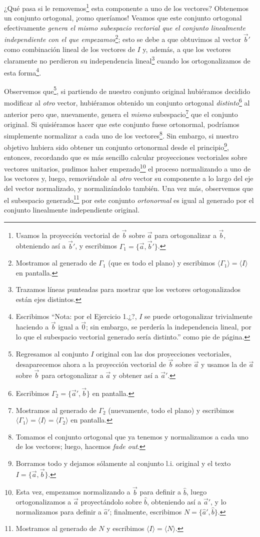\documentclass[12pt,dvipsnames]{article}
\numberwithin{equation}{section}
\begin{document}
¿Qué pasa si le removemos\footnote{Usamos la proyección vectorial de $\vec{b}$ sobre $\vec{a}$ para ortogonalizar a $\vec{b}$, obteniendo así a $\vec{b}'$, y escribimos $\Gamma_1=\{\vec{a},\vec{b}'\}$.} esta componente a uno de los vectores? Obtenemos un conjunto ortogonal, ¡como queríamos! Veamos que este conjunto ortogonal efectivamente \emph{genera el mismo subespacio vectorial que el conjunto linealmente independiente con el que empezamos}\footnote{Mostramos al generado de $\Gamma_1$ (que es todo el plano) y escribimos $\langle \Gamma_1 \rangle = \langle I \rangle$ en pantalla.}; esto se debe a que obtuvimos al vector $\vec{b}'$ como combinación lineal de los vectores de $I$ y, además, a que los vectores claramente no perdieron su independencia lineal\footnote{Trazamos líneas punteadas para mostrar que los vectores ortogonalizados están ejes distintos.} cuando los ortogonalizamos de esta forma\footnote{Escribimos ``Nota: por el Ejercicio 1.¿?, $I$ se puede ortogonalizar trivialmente haciendo a $\vec{b}$ igual a $\vec{0}$; sin embargo, se perdería la independencia lineal, por lo que el subespacio vectorial generado sería distinto.'' como pie de página.}.

Observemos que\footnote{Regresamos al conjunto $I$ original con las dos proyecciones vectoriales, desaparecemos ahora a la proyección vectorial de $\vec{b}$ sobre $\vec{a}$ y usamos la de $\vec{a}$ sobre $\vec{b}$ para ortogonalizar a $\vec{a}$ y obtener así a $\vec{a}'$.}, si partiendo de nuestro conjunto original hubiéramos decidido modificar al \emph{otro} vector, hubiéramos obtenido un conjunto ortogonal \emph{distinto}\footnote{Escribimos $\Gamma_2=\{\vec{a}',\vec{b}\}$ en pantalla.} al anterior pero que, nuevamente, genera el \emph{mismo} subespacio\footnote{Mostramos al generado de $\Gamma_2$ (nuevamente, todo el plano) y escribimos $\langle \Gamma_1 \rangle = \langle I \rangle=\langle \Gamma_2 \rangle$ en pantalla.} que el conjunto original. Si quisiéramos hacer que este conjunto fuese ortonormal, podríamos simplemente normalizar a cada uno de los vectores\footnote{Tomamos el conjunto ortogonal que ya tenemos y normalizamos a cada uno de los vectores; luego, hacemos \emph{fade out}.}. Sin embargo, si nuestro objetivo hubiera sido obtener un conjunto ortonormal desde el principio\footnote{Borramos todo y dejamos sólamente al conjunto l.i. original y el texto $I=\{\vec{a},\vec{b}\}$.}, entonces, recordando que es más sencillo calcular proyecciones vectoriales sobre vectores unitarios, pudimos haber empezado\footnote{Esta vez, empezamos normalizando a $\vec{b}$ para definir a $\hat{b}$, luego ortogonalizamos a $\vec{a}$ proyectándolo sobre $\hat{b}$, obteniendo así a $\vec{a}'$, y lo normalizamos para definir a $\hat{a}'$; finalmente, escribimos $N=\{\hat{a}',\hat{b}\}$.} el proceso normalizando a uno de los vectores y, luego, removiéndole al \emph{otro} vector su componente a lo largo del eje del vector normalizado, y normalizándolo también. Una vez más, observemos que el subespacio generado\footnote{Mostramos al generado de $N$ y escribimos $\langle I\rangle=\langle N\rangle$.} por este conjunto \emph{ortonormal} es igual al generado por el conjunto linealmente independiente original.
\end{document}
